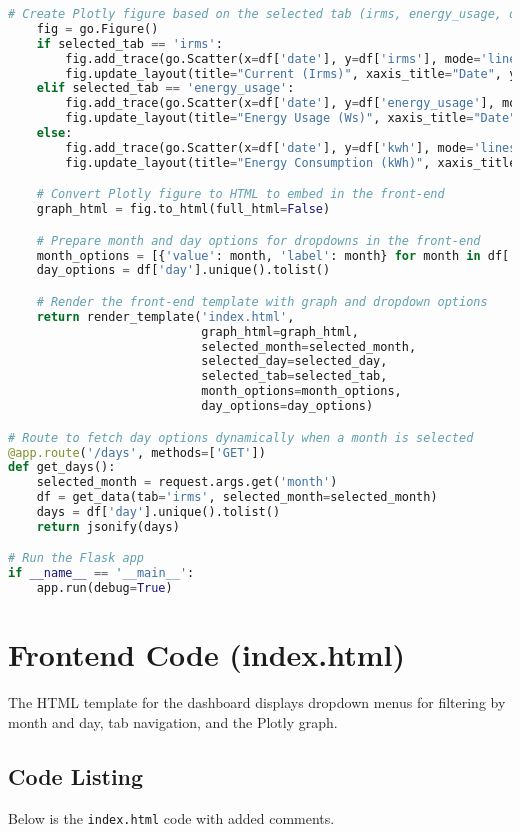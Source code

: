 \begin{lstlisting}[language=Python, caption=app.py, frame=single]
    # Create Plotly figure based on the selected tab (irms, energy_usage, or kWh)
    fig = go.Figure()
    if selected_tab == 'irms':
        fig.add_trace(go.Scatter(x=df['date'], y=df['irms'], mode='lines', name='Irms'))
        fig.update_layout(title="Current (Irms)", xaxis_title="Date", yaxis_title="Current (A)")
    elif selected_tab == 'energy_usage':
        fig.add_trace(go.Scatter(x=df['date'], y=df['energy_usage'], mode='lines', name='Energy Usage'))
        fig.update_layout(title="Energy Usage (Ws)", xaxis_title="Date", yaxis_title="Energy (Ws)")
    else:
        fig.add_trace(go.Scatter(x=df['date'], y=df['kwh'], mode='lines', name='kWh'))
        fig.update_layout(title="Energy Consumption (kWh)", xaxis_title="Date", yaxis_title="kWh")

    # Convert Plotly figure to HTML to embed in the front-end
    graph_html = fig.to_html(full_html=False)

    # Prepare month and day options for dropdowns in the front-end
    month_options = [{'value': month, 'label': month} for month in df['month'].unique()]
    day_options = df['day'].unique().tolist()

    # Render the front-end template with graph and dropdown options
    return render_template('index.html', 
                           graph_html=graph_html,
                           selected_month=selected_month, 
                           selected_day=selected_day,
                           selected_tab=selected_tab,
                           month_options=month_options,
                           day_options=day_options)

# Route to fetch day options dynamically when a month is selected
@app.route('/days', methods=['GET'])
def get_days():
    selected_month = request.args.get('month')
    df = get_data(tab='irms', selected_month=selected_month)
    days = df['day'].unique().tolist()
    return jsonify(days)

# Run the Flask app
if __name__ == '__main__':
    app.run(debug=True)
\end{lstlisting}

\section{Frontend Code (index.html)}

The HTML template for the dashboard displays dropdown menus for filtering by month and day, tab navigation, and the Plotly graph.

\subsection{Code Listing}
Below is the \texttt{index.html} code with added comments.

